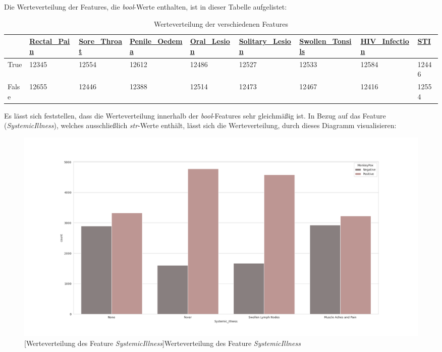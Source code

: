 \documentclass[13pt,a4paper, listof=entryprefix, bibliography=totocnumbered,toc=listofnumbered,lof=listofnumbered]{scrartcl}
\begin{document}
Die Werteverteilung der Features, die \textit{bool}-Werte enthalten, ist in dieser Tabelle aufgelistet: 
	
	\begin{singlespace}
	\begin{table}[H]
		\begin{adjustbox}{width=1\textwidth}
			\small
		\begin{tabular}{|l|l|l|l|l|l|l|l|l|}
			\hline  & \url{Rectal_Pain}&  \url{Sore_Throat}	& \url{Penile_Oedema} & \url{Oral_Lesion} & \url{Solitary_Lesion} &\url{Swollen_Tonsils} & \url{HIV_Infection} & \url{STI} \\
			\hline True & 12345 & 12554 & 12612 & 12486 & 12527 & 12533 & 12584  & 12446 \\
			\hline False & 12655 & 12446 & 12388& 12514 & 12473 & 12467 & 12416 & 12554\\
			\hline
		\end{tabular}
	\end{adjustbox}
		\caption{Werteverteilung der verschiedenen Features} %
		\label{tab:werteverteilung_features}
	\end{table}
\end{singlespace}
	

Es lässt sich feststellen, dass die Werteverteilung innerhalb der \textit{bool}-Features sehr gleichmäßig ist. 
In Bezug auf das Feature (\textit{SystemicIllness}), welches ausschließlich \textit{str}-Werte enthält, lässt sich die 
Werteverteilung, durch dieses Diagramm visualisieren: 

	\begin{figure}[H]
		\centering
		\includegraphics[width=0.8\linewidth]{Bilder/systemic_illness_plot.png}
		[Werteverteilung des Feature \textit{Systemic\textunderscore Illness}]{Werteverteilung des Feature \textit{Systemic\textunderscore Illness}}
		\label{fig:systemic_illness_plot}
	\end{figure}
\end{document}
